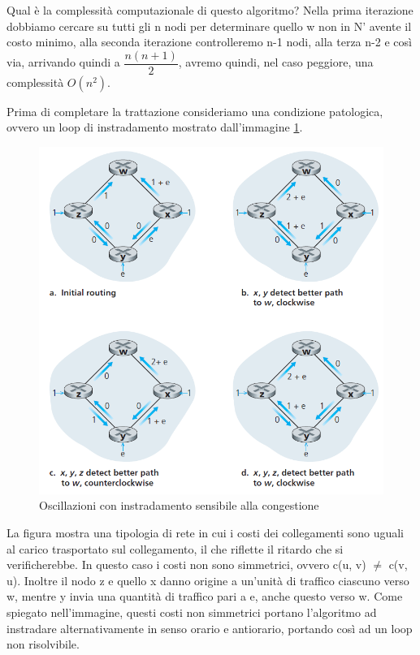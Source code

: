 \documentclass[11pt,a4paper]{article}
\begin{document}
Qual è la complessità computazionale di questo algoritmo? Nella prima iterazione dobbiamo cercare su tutti gli n nodi per determinare quello w non in N' avente il costo minimo, alla seconda iterazione controlleremo n-1 nodi, alla terza n-2 e così via, arrivando quindi a $\dfrac{n(n+1)}{2}$, avremo quindi, nel caso peggiore, una complessità $O(n^{2})$.

Prima di completare la trattazione consideriamo una condizione patologica, ovvero un loop di instradamento mostrato dall'immagine \ref{fig: 063}.
\begin{figure}
	\includegraphics[scale=0.7]{img/063.png}
	\caption{Oscillazioni con instradamento sensibile alla congestione}
	\label{fig: 063}
\end{figure}
La figura mostra una tipologia di rete in cui i costi dei collegamenti sono uguali al carico trasportato sul collegamento, il che riflette il ritardo che si verificherebbe. In questo caso i costi non sono simmetrici, ovvero c(u, v) $\neq$ c(v, u). Inoltre il nodo z e quello x danno origine a un'unità di traffico ciascuno verso w, mentre y invia una quantità di traffico pari a e, anche questo verso w. Come spiegato nell'immagine, questi costi non simmetrici portano l'algoritmo ad instradare alternativamente in senso orario e antiorario, portando così ad un loop non risolvibile.
\end{document}
